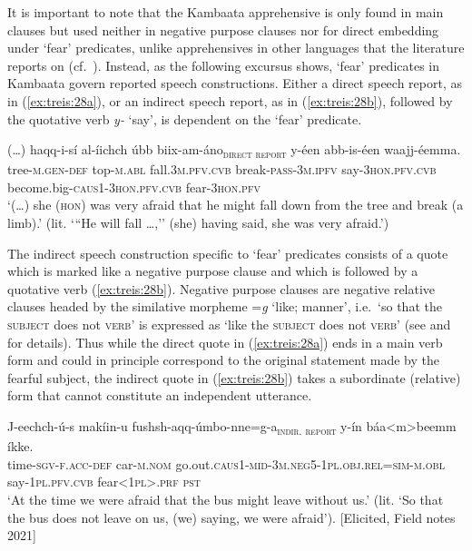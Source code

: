 \documentclass[output=paper,colorlinks,citecolor=brown,
]{langsci/langscibook}
\begin{document}
It is important to note that the Kambaata apprehensive is only found in main clauses but used neither in negative purpose clauses nor for direct embedding under `fear' predicates, unlike apprehensives in other languages that the literature reports on (cf.\  \citealt{lichtenberk1995}). Instead, as the following excursus shows, `fear' predicates in Kambaata govern reported speech constructions. Either a direct speech report, as in (\ref{ex:treis:28a}), or an indirect speech report, as in (\ref{ex:treis:28b}), followed by the quotative verb \textit{y-} `say', is dependent on the `fear' predicate. 

\ea\label{ex:treis:28a} 
\gll \textnormal{(\ldots)} {\ob}haqq-i-sí al-íichch úbb biix-am-áno{\cb}\textsubscript{\textnormal{\textsc{direct report}}} y-éen abb-is-éen waajj-éemma. \\
{} \hphantom{[}tree-\textsc{m.gen-def} top-\textsc{m.abl} fall.\textsc{3m.pfv.cvb} break-\textsc{pass-3m.ipfv} say-\textsc{3hon.pfv.cvb} become.big-\textsc{caus1-3hon.pfv.cvb} fear-\textsc{3hon.pfv}\\
\glt `(\ldots) she (\textsc{hon}) was very afraid that he might fall down from the tree and break (a limb).' (lit. `{``}He will fall \ldots,'' (she) having said, she was very afraid.')  \citep[4.45]{KEB1989}
\z

The indirect speech construction specific to `fear' predicates consists of a quote which is marked like a negative purpose clause and which is followed by a quotative verb (\ref{ex:treis:28b}). Negative purpose clauses are negative relative clauses headed by the similative morpheme =\textit{g} `like; manner',  i.e.\ `so that the \textsc{subject} does not \textsc{verb}' is expressed as `like the \textsc{subject} does not \textsc{verb}' (see \citealt{Treis2010} and \citeyear{Treis2017} for details). Thus while the direct quote in (\ref{ex:treis:28a}) ends in a main verb form and could in principle correspond to the original statement made by the fearful subject, the indirect quote in (\ref{ex:treis:28b}) takes a subordinate (relative) form that cannot constitute an independent utterance.

\ea\label{ex:treis:28b} 
\gll J-eechch-ú-s {\ob}makíin-u fushsh-aqq-úmbo-nne=g-a{\cb}\textsubscript{\textnormal{\textsc{indir. report}}} y-ín báa<m>beemm íkke. \\
time-\textsc{sgv-f.acc-def} \hphantom{[}car-\textsc{m.nom} go.out.\textsc{caus1-mid-3m.neg5-1pl.obj.rel=sim-m.obl} say-\textsc{1pl.pfv.cvb} fear\textsc{<1pl>.prf} \textsc{pst}\\
\glt `At the time we were afraid that the bus might leave without us.' (lit. `So that the bus does not leave on us, (we) saying, we were afraid'). [Elicited, Field notes 2021]
\z 
\end{document}
